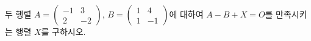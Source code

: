\hspace*{2mm}\begin{minipage}[t]{\dimexpr\linewidth-2mm\relax}\vspace{0pt}
두 행렬 $A=\begin{pmatrix} -1 & 3 \\ 2 & -2 \end{pmatrix}$, $B=\begin{pmatrix} 1 & 4 \\ 1 & -1 \end{pmatrix}$에 대하여 $A-B+X=O$를 만족시키는 행렬 $X$를 구하시오.\end{minipage}

